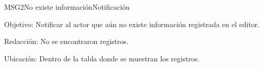\begin{mensaje}{MSG2}{No existe información}{Notificación}
	\item [Objetivo:] Notificar al actor que aún no existe información registrada en el editor.
	\item[Redacción:] No se encontraron registros.
	\item [Ubicación:] Dentro de la tabla donde se muestran los registros.
\end{mensaje}
